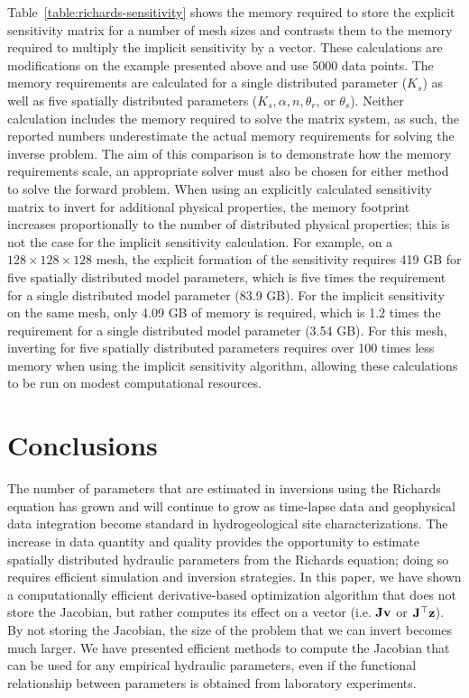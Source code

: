 \documentclass[preprint,review,3p,times,onecolumn,authoryear]{elsarticle}
\begin{document}
Table~\ref{table:richards-sensitivity} shows the memory required to store the explicit sensitivity matrix for a number of mesh sizes and contrasts them to the memory required to multiply the implicit sensitivity by a vector. These calculations are modifications on the example presented above and use 5000 data points. The memory requirements are calculated for a single distributed parameter ($K_s$) as well as five spatially distributed parameters ($K_s, \alpha, n, \theta_r$, or $\theta_s$). Neither calculation includes the memory required to solve the matrix system, as such, the reported numbers underestimate the actual memory requirements for solving the inverse problem. The aim of this comparison is to demonstrate how the memory requirements scale, an appropriate solver must also be chosen for either method to solve the forward problem. When using an explicitly calculated sensitivity matrix to invert for additional physical properties, the memory footprint increases proportionally to the number of distributed physical properties; this is not the case for the implicit sensitivity calculation. For example, on a $128\times128\times128$ mesh, the explicit formation of the sensitivity requires 419 GB for five spatially distributed model parameters, which is five times the requirement for a single distributed model parameter (83.9 GB). For the implicit sensitivity on the same mesh, only 4.09 GB of memory is required, which is 1.2 times the requirement for a single distributed model parameter (3.54 GB). For this mesh, inverting for five spatially distributed parameters requires over 100 times less memory when using the implicit sensitivity algorithm, allowing these calculations to be run on modest computational resources.

\section{Conclusions}

The number of parameters that are estimated in inversions using the Richards equation has grown and will continue to grow as time-lapse data and geophysical data integration become standard in hydrogeological site characterizations. The increase in data quantity and quality provides the opportunity to estimate spatially distributed hydraulic parameters from the Richards equation; doing so requires efficient simulation and inversion strategies. In this paper, we have shown a computationally efficient derivative-based optimization algorithm that does not store the Jacobian, but rather computes its effect on a vector (i.e. $\bf Jv$ or $\bf J^\top z$). By not storing the Jacobian, the size of the problem that we can invert becomes much larger. We have presented efficient methods to compute the Jacobian that can be used for any empirical hydraulic parameters, even if the functional relationship between parameters is obtained from laboratory experiments.
\end{document}
